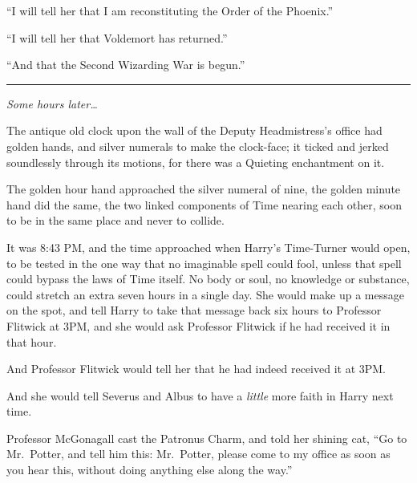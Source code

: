 ``I will tell her that I am reconstituting the Order of the Phoenix.''

``I will tell her that Voldemort has returned.''

``And that the Second Wizarding War is begun.''

\begin{center}\rule{3in}{0.4pt}\end{center}

\emph{Some hours later\ldots{}}

The antique old clock upon the wall of the Deputy Headmistress's office
had golden hands, and silver numerals to make the clock-face; it ticked
and jerked soundlessly through its motions, for there was a Quieting
enchantment on it.

The golden hour hand approached the silver numeral of nine, the golden
minute hand did the same, the two linked components of Time nearing each
other, soon to be in the same place and never to collide.

It was 8:43 PM, and the time approached when Harry's Time-Turner would
open, to be tested in the one way that no imaginable spell could fool,
unless that spell could bypass the laws of Time itself. No body or soul,
no knowledge or substance, could stretch an extra seven hours in a
single day. She would make up a message on the spot, and tell Harry to
take that message back six hours to Professor Flitwick at 3PM, and she
would ask Professor Flitwick if he had received it in that hour.

And Professor Flitwick would tell her that he had indeed received it at
3PM.

And she would tell Severus and Albus to have a \emph{little} more faith
in Harry next time.

Professor McGonagall cast the Patronus Charm, and told her shining cat,
``Go to Mr.~Potter, and tell him this: Mr.~Potter, please come to my
office as soon as you hear this, without doing anything else along the
way.''
